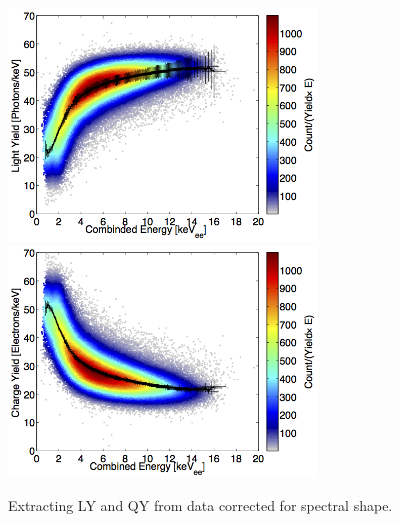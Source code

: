 \newpage
 \begin{figure}[h!]\centering
 \includegraphics[width=82mm]{Recombination_LY_QY/Figures/Iter1/LY_c_180_means_LY_QY_iter1.png}
 \includegraphics[width=82mm]{Recombination_LY_QY/Figures/Iter1/QY_fid_means_LY_QY_iter1.png}
\caption{Extracting LY and QY from data corrected for spectral shape.}
\label{fig:LYQY_data}
\end{figure}


